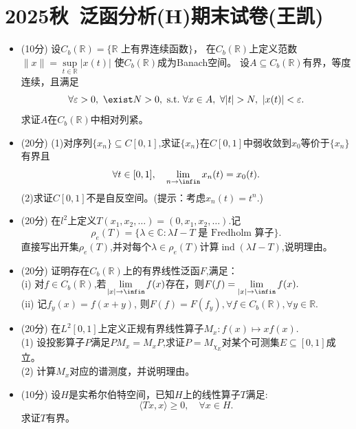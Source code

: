\section{2025秋\ 泛函分析(H)期末试卷(王凯)}
\begin{itemize}
    \item[1.] (10分) 设\(C_b(\mathbb{R})= \{ \mathbb{R} \text{ 上有界连续函数} \} \)，
    在\(C_b(\mathbb{R})\)上定义范数\(\| x \| = \sup\limits_{t \in \mathbb{R}} | x(t) | \) 使\(C_b(\mathbb{R})\)成为Banach空间。
    设\(A \subseteq C_b(\mathbb{R}) \)有界，等度连续，且满足
    \[
        \forall \varepsilon > 0,\ \exist N > 0,\ \text{s.t.}\ \forall x \in A,\ \forall |t| > N,\ |x(t)| < \varepsilon.
    \]
    求证\(A\)在\(C_b(\mathbb{R})\)中相对列紧。

    \item[2.] (20分) (1)对序列\(\{x_n\} \subseteq C[0,1]\),求证\(\{x_n\}\)在\(C[0,1]\)中弱收敛到\(x_0\)等价于\(\{x_n\}\)有界且
    \[
        \forall t \in [0,1], \quad \lim_{n \to \infin} x_n(t) = x_0(t).
    \]
    (2)求证\(C[0,1]\)不是自反空间。(提示：考虑\(x_n(t) = t^n.\))

    \item[3.] (20分) 在\(l^2\)上定义\(T(x_1,x_2,\dots)=(0,x_1,x_2,\dots)\).记
    \[
        \rho_e(T) = \{\lambda \in \mathbb{C} : \lambda I - T \text{ 是 Fredholm 算子}\}.
    \]
    直接写出开集\(\rho_e(T)\),并对每个\(\lambda \in \rho_e(T)\)计算\(\operatorname{ind}(\lambda I - T) \),说明理由。

    \item[4.] (20分) 证明存在\(C_b(\mathbb{R})\)上的有界线性泛函\(F\),满足：\\
    \quad (i) 对\(f \in C_b(\mathbb{R})\),若\(\lim\limits_{|x| \to \infin} f(x) \)存在，则\(F(f)=\lim\limits_{|x| \to \infin} f(x).\)\\
    \quad (ii) 记\(f_y(x) = f(x+y)\), 则\(F(f)=F(f_y), \forall f \in C_b(\mathbb{R}), \forall y \in \mathbb{R}.\)

    \item[5.] (20分) 在\(L^2[0,1]\)上定义正规有界线性算子\(M_x:f(x) \mapsto xf(x)\).\\
    (1) 设投影算子\(P\)满足\(PM_x=M_xP\),求证\(P = M_{\chi_E}\)对某个可测集\(E \subseteq [0,1]\)成立。\\
    (2) 计算\(M_x\)对应的谱测度，并说明理由。


    \item[6.] (10分) 设\(H\)是实希尔伯特空间，已知\(H\)上的线性算子\(T\)满足:
    \[
        \langle Tx, x \rangle \geq 0 ,\quad \forall x \in H.
    \]
    求证\(T\)有界。

\end{itemize}

